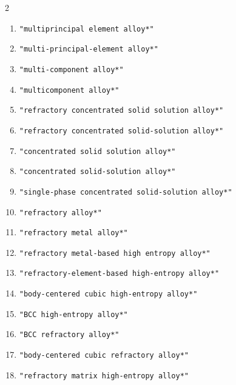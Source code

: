 \begin{multicols}{2}
\begin{enumerate}
  \item \texttt{"multiprincipal element alloy*"}
  \item \texttt{"multi-principal-element alloy*"}
  \item \texttt{"multi-component alloy*"}
  \item \texttt{"multicomponent alloy*"}
  \item \texttt{"refractory concentrated solid solution alloy*"}
  \item \texttt{"refractory concentrated solid-solution alloy*"}
  \item \texttt{"concentrated solid solution alloy*"}
  \item \texttt{"concentrated solid-solution alloy*"}
  \item \texttt{"single-phase concentrated solid-solution alloy*"}
  \item \texttt{"refractory alloy*"}
  \item \texttt{"refractory metal alloy*"}
  \item \texttt{"refractory metal-based high entropy alloy*"}
  \item \texttt{"refractory-element-based high-entropy alloy*"}
  \item \texttt{"body-centered cubic high-entropy alloy*"}
  \item \texttt{"BCC high-entropy alloy*"}
  \item \texttt{"BCC refractory alloy*"}
  \item \texttt{"body-centered cubic refractory alloy*"}
  \item \texttt{"refractory matrix high-entropy alloy*"}
\end{enumerate}
\end{multicols}

